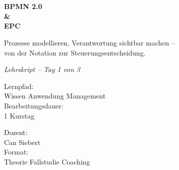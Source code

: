 \documentclass[11pt,a4paper,oneside]{article}
\newcommand{\caveatfontfallback}{\itshape}
\newcommand\caveatfont{\caveatfontfallback}%
\begin{document}
\begin{titlepage}
  \pagestyle{empty}
  \vspace*{1.5cm}
  \\[2pt]
  \noindent{\color{lpAccent}\rule{\linewidth}{1.2pt}}\\[4pt]

  \vspace{3cm}
  {\sffamily\fontsize{30}{34}\selectfont\bfseries\color{lpInk}BPMN 2.0\\\&\\EPC\par}

  \vspace{0.7cm}
  {\sffamily\large\color{lpGray}Prozesse modellieren, Verantwortung sichtbar machen --\\von der Notation zur Steuerungsentscheidung.\par}

  \vspace{1.5cm}
  {\caveatfont\LARGE\color{lpAmber}Lehrskript -- Tag 1 von 3}\par

  \vfill

  \noindent\begin{minipage}{0.55\linewidth}
    {\sffamily\footnotesize\color{lpGray}Lernpfad:}\\
    {\sffamily\small\color{lpInk}Wissen \textrightarrow{} Anwendung \textrightarrow{} Management}\\[10pt]
    {\sffamily\footnotesize\color{lpGray}Bearbeitungsdauer:}\\
    {\sffamily\small\color{lpInk}1 Kurstag}
  \end{minipage}\hfill
  \begin{minipage}{0.4\linewidth}
    \raggedleft
    {\sffamily\footnotesize\color{lpGray}Dozent:}\\
    {\sffamily\small\color{lpInk}Can Siebert}\\[10pt]
    {\sffamily\footnotesize\color{lpGray}Format:}\\
    {\sffamily\small\color{lpInk}Theorie \textperiodcentered{} Fallstudie \textperiodcentered{} Coaching}
  \end{minipage}

  \vspace{0.5cm}
  \noindent{\color{lpAccent}\rule{\linewidth}{0.6pt}}
\end{titlepage}
\end{document}
